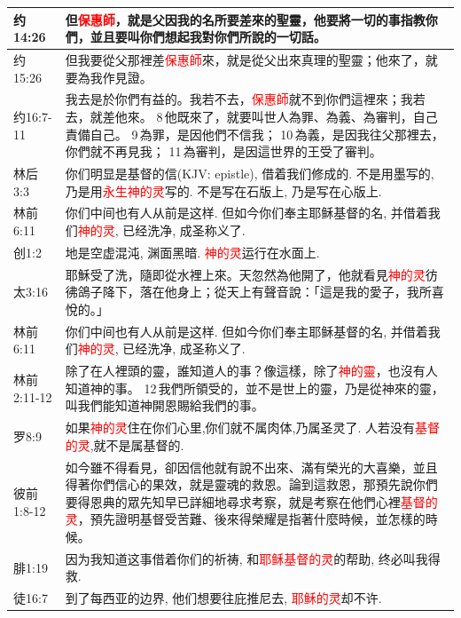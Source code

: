 \begin{table}[H]
\begin{tabular}{p{6em}|p{42em}}
约14:26&但\textcolor{red}{保惠師}，就是父因我的名所要差來的聖靈，他要將一切的事指教你們，並且要叫你們想起我對你們所說的一切話。\\  \midrule
约15:26&但我要從父那裡差\textcolor{red}{保惠師}來，就是從父出來真理的聖靈；他來了，就要為我作見證。\\  \midrule
约16:7-11&我去是於你們有益的。我若不去，\textcolor{red}{保惠師}就不到你們這裡來；我若去，就差他來。 8 他既來了，就要叫世人為罪、為義、為審判，自己責備自己。 9 為罪，是因他們不信我； 10 為義，是因我往父那裡去，你們就不再見我； 11 為審判，是因這世界的王受了審判。\\  \midrule

林后3:3&你们明显是基督的信(KJV: epistle), 借着我们修成的. 不是用墨写的, 乃是用\textcolor{red}{永生神的灵}写的. 不是写在石版上, 乃是写在心版上.\\  \midrule
林前6:11&你们中间也有人从前是这样. 但如今你们奉主耶稣基督的名, 并借着我们\textcolor{red}{神的灵}, 已经洗净, 成圣称义了.\\  \midrule

创1:2&地是空虚混沌, 渊面黑暗. \textcolor{red}{神的灵}运行在水面上.\\  \midrule
太3:16&耶穌受了洗，隨即從水裡上來。天忽然為他開了，他就看見\textcolor{red}{神的灵}彷彿鴿子降下，落在他身上；從天上有聲音說：「這是我的愛子，我所喜悅的。」\\  \midrule
林前6:11&你们中间也有人从前是这样. 但如今你们奉主耶稣基督的名, 并借着我们\textcolor{red}{神的灵}, 已经洗净, 成圣称义了.\\  \midrule
林前2:11-12&除了在人裡頭的靈，誰知道人的事？像這樣，除了\textcolor{red}{神的靈}，也沒有人知道神的事。 12 我們所領受的，並不是世上的靈，乃是從神來的靈，叫我們能知道神開恩賜給我們的事。\\  \midrule


罗8:9&如果\textcolor{red}{神的灵}住在你们心里,你们就不属肉体,乃属圣灵了. 人若没有\textcolor{red}{基督的灵},就不是属基督的.\\  \midrule 
彼前1:8-12&如今雖不得看見，卻因信他就有說不出來、滿有榮光的大喜樂，並且得著你們信心的果效，就是靈魂的救恩。論到這救恩，那預先說你們要得恩典的眾先知早已詳細地尋求考察，就是考察在他們心裡\textcolor{red}{基督的灵}，預先證明基督受苦難、後來得榮耀是指著什麼時候，並怎樣的時候。\\  \midrule
腓1:19&因为我知道这事借着你们的祈祷, 和\textcolor{red}{耶稣基督的灵}的帮助, 终必叫我得救.\\  \midrule
徒16:7&到了每西亚的边界, 他们想要往庇推尼去, \textcolor{red}{耶稣的灵}却不许.\\  \midrule

\end{tabular}
\end{table}


